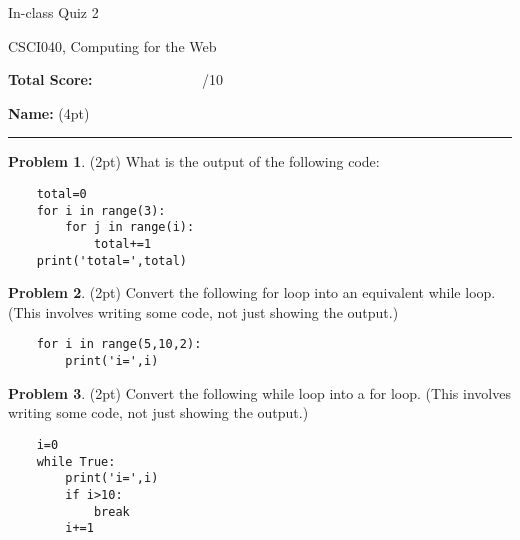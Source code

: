 \documentclass[10pt]{article}
\theoremstyle{definition}
\newtheorem{problem}{Problem}
\begin{document}
\begin{center}
    {
\Large
In-class Quiz 2 
}

    \vspace{0.1in}
CSCI040, Computing for the Web

    \vspace{0.1in}
\end{center}

\vspace{0.25in}
\noindent
\textbf{Total Score:} ~~~~~~~~~~~~~~~/10

\vspace{0.5in}
\noindent
\textbf{Name:} (4pt)

\noindent
\rule{\textwidth}{0.1pt}
\vspace{0.25in}

\begin{problem}
    (2pt)
    What is the output of the following code:
\end{problem}
\begin{lstlisting}
    total=0
    for i in range(3):
        for j in range(i):
            total+=1
    print('total=',total)
\end{lstlisting}
\vspace{2in}

\newpage
\begin{problem}
    (2pt)
    Convert the following for loop into an equivalent while loop.
    (This involves writing some code, not just showing the output.)
\end{problem}
\begin{lstlisting}
    for i in range(5,10,2):
        print('i=',i)
\end{lstlisting}
\vspace{3.5in}

\begin{problem}
    (2pt)
    Convert the following while loop into a for loop.
    (This involves writing some code, not just showing the output.)
\end{problem}
\begin{lstlisting}
    i=0
    while True:
        print('i=',i)
        if i>10:
            break
        i+=1
\end{lstlisting}
\vspace{1.5in}
\end{document}
